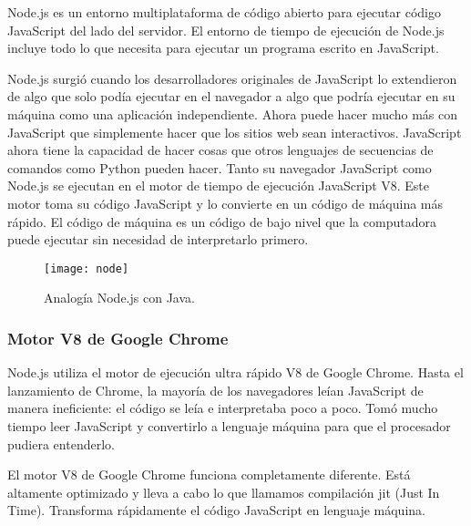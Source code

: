 Node.js es un entorno multiplataforma de código abierto para ejecutar código JavaScript del lado del servidor. El entorno de tiempo de ejecución de Node.js incluye todo lo que necesita para ejecutar un programa escrito en JavaScript. 
\vspace{0.8cm}

Node.js surgió cuando los desarrolladores originales de JavaScript lo extendieron de algo que solo podía ejecutar en el navegador a algo que podría ejecutar en su máquina como una aplicación independiente. Ahora puede hacer mucho más con JavaScript que simplemente hacer que los sitios web sean interactivos. JavaScript ahora tiene la capacidad de hacer cosas que otros lenguajes de secuencias de comandos como Python pueden hacer. Tanto su navegador JavaScript como Node.js se ejecutan en el motor de tiempo de ejecución JavaScript V8. Este motor toma su código JavaScript y lo convierte en un código de máquina más rápido. El código de máquina es un código de bajo nivel que la computadora puede ejecutar sin necesidad de interpretarlo primero.
\vspace{0.8cm}

\begin{figure}[H]
  \centering
  \texttt{[image: node]}
  \caption{Analogía Node.js con Java.}
\end{figure}

\subsubsection{Motor V8 de Google Chrome}
Node.js utiliza el motor de ejecución ultra rápido V8 de Google Chrome. Hasta el lanzamiento de Chrome, la mayoría de los navegadores leían JavaScript de manera ineficiente: el código se leía e interpretaba poco a poco. Tomó mucho tiempo leer JavaScript y convertirlo a lenguaje máquina para que el procesador pudiera entenderlo. 
\vspace{0.8cm}

El motor V8 de Google Chrome funciona completamente diferente. Está altamente optimizado y lleva a cabo lo que llamamos compilación \acrshort{jit} (Just In Time). Transforma rápidamente el código JavaScript en lenguaje máquina.
\vspace{0.8cm}

